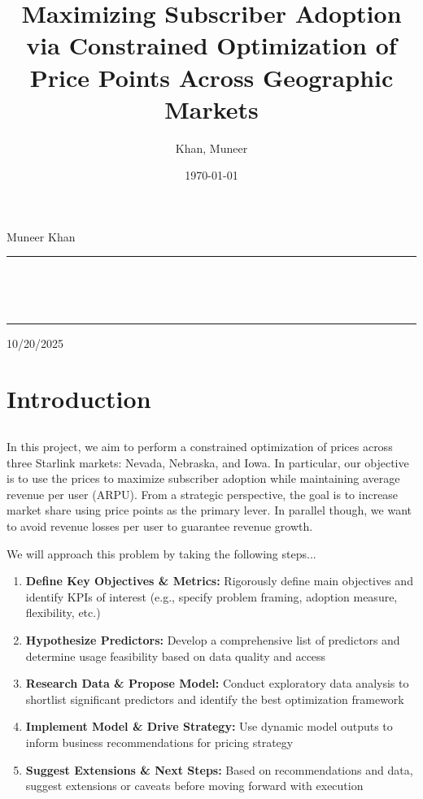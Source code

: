 \documentclass[11pt, titlepage]{report}
\author{Khan, Muneer}
\title{\textbf{Maximizing Subscriber Adoption via Constrained Optimization of Price Points Across Geographic Markets}}
\date{\today}
\newcommand{\HRule}{\rule{\linewidth}{0.5mm}} %
\begin{document}
\begin{titlepage}
\centering

\phantom{0}
\vspace{5.5cm}

\makeatletter
\begin{flushleft}
{\Large Muneer Khan}
\end{flushleft}

\vspace{-0.5cm}

\HRule \\[0.3cm]
{\begin{flushleft}
\huge \@title\\[0.3cm]
\end{flushleft}}
\HRule

\vspace{0.1cm}
\begin{flushleft}
{\Large 10/20/2025}
\end{flushleft}

\vfill
\makeatother

\end{titlepage}

\chapter*{Introduction}
\section*{} \vspace{-4em}
In this project, we aim to perform a constrained optimization of prices across three Starlink markets: Nevada, Nebraska, and Iowa. In particular, our objective is to use the prices to maximize subscriber adoption while maintaining average revenue per user (ARPU). From a strategic perspective, the goal is to increase market share using price points as the primary lever. In parallel though, we want to avoid revenue losses per user to guarantee revenue growth. \par

We will approach this problem by taking the following steps...
\begin{enumerate}[topsep=0pt, itemsep=0pt]
  \item \textbf{Define Key Objectives \& Metrics:} Rigorously define main objectives and identify KPIs of interest (e.g., specify problem framing, adoption measure, flexibility, etc.)
  \item \textbf{Hypothesize Predictors:} Develop a comprehensive list of predictors and determine usage feasibility based on data quality and access
  \item \textbf{Research Data \& Propose Model:} Conduct exploratory data analysis to shortlist significant predictors and identify the best optimization framework
  \item \textbf{Implement Model \& Drive Strategy:} Use dynamic model outputs to inform business recommendations for pricing strategy
  \item \textbf{Suggest Extensions \& Next Steps:} Based on recommendations and data, suggest extensions or caveats before moving forward with execution
\end{enumerate}
\end{document}
